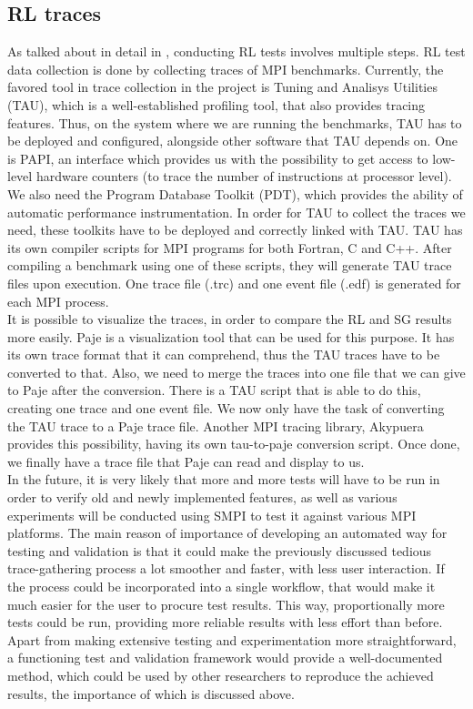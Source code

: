 \subsection{RL traces}
As talked about in detail in \cite{ms11}, conducting RL tests involves
multiple steps. RL test data collection is done by collecting traces
of MPI benchmarks. Currently, the favored tool in trace collection in
the project is Tuning and Analisys Utilities (TAU)\cite{sm06}, which
is a well-established profiling tool, that also provides tracing
features. Thus, on the system
where we are running the benchmarks, TAU has to be deployed and
configured, alongside other software that TAU depends on. One is
PAPI\cite{mbdh99}\cite{lmmsl01},
an interface which provides us with the possibility to
get access to low-level hardware counters (to trace the number of
instructions at processor level). We also need the Program Database
Toolkit (PDT)\cite{lcmsmrr00}, which provides the ability of automatic performance
instrumentation. In order for TAU to collect the traces we need, these
toolkits have to be deployed and correctly linked with TAU. TAU has
its own compiler scripts for MPI programs for both Fortran, C and
C++. After compiling a benchmark using one of these scripts, they will
generate TAU trace files upon execution. One trace file (.trc)
and one event file (.edf) is generated for each MPI process.\\
It is possible to visualize the traces, in order to compare the RL and SG
results more easily. Paje is a visualization tool that can be used for
this purpose. It has its own trace format that it can comprehend, thus
the TAU traces have to be converted to that. Also, we need to merge
the traces into one file that we can give to Paje after the
conversion. There is a
TAU script that is able to do this, creating one trace and one event
file. We now only have the task of converting the TAU trace to a Paje
trace file. Another MPI tracing library, Akypuera provides this
possibility, having its own tau-to-paje conversion script. Once done,
we finally have a trace file that Paje can read and display to us.\\
In the future, it is very likely that more and more tests will have to
be run in order to verify old and newly implemented features, as well
as various experiments will be conducted using SMPI to test it against
various MPI platforms. The main reason of importance of developing an
automated way for testing and validation is that it could make the
previously discussed tedious trace-gathering process a lot smoother
and faster, with less user interaction. If the process could be
incorporated into a single workflow, that would make it much easier
for the user to procure test results. This way, proportionally more
tests could be run, providing more reliable results with less effort
than before. Apart from making extensive testing and experimentation
more straightforward, a functioning test and
validation framework would provide a well-documented method, which
could be used by other researchers to reproduce the achieved results,
the importance of which is discussed above.
